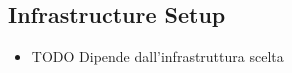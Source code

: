 \subsection{Infrastructure Setup}

\begin{itemize}
	\item TODO Dipende dall'infrastruttura scelta
\end{itemize}